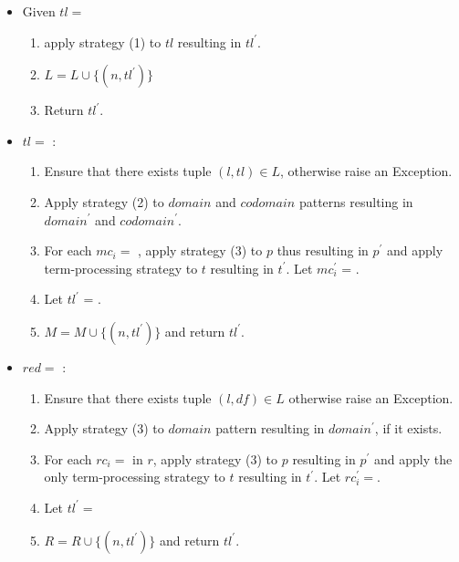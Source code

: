 \begin{itemize}
\item
Given $tl=$\TlDefineLanguage
	\begin{enumerate}
		\item apply strategy (1) to $tl$ resulting in $tl^{\prime}$.
		\item $L = L \cup \{ (n, tl^{\prime}) \}$
		\item Return $tl^{\prime}$.
	\end{enumerate}

\item $tl=$ \TlDefineMetafunction:
	\begin{enumerate}
	\item Ensure that there exists tuple $(l, tl) \in L$, otherwise raise an Exception.
	\item Apply strategy (2) to $domain$ and $codomain$ patterns resulting in $domain^\prime$ and $codomain^\prime$.
	\item For each $mc_i=$ \MetafunctionCase, apply strategy (3) to $p$ thus resulting in $p^{\prime}$ and apply term-processing strategy to $t$ resulting in $t^{\prime}$. Let $mc_i^{\prime}$ = \MetafunctionCase[$p^{\prime}$][$t^{\prime}$].
	\item Let $tl^\prime$  = .
	\item $M = M \cup \{ (n, tl^\prime)\}$ and return $tl^\prime$.
	\end{enumerate}

\item $red=$ \TlDefineReductionRelation:
\begin{enumerate}
\item Ensure that there exists tuple $(l, df) \in L$ otherwise raise an Exception.
\item Apply strategy (3) to $domain$ pattern resulting in $domain^\prime$, if it exists.
\item For each $rc_i=$ \ReductionCase \space in $r$, apply strategy (3) to $p$ resulting in $p^{\prime}$ and apply the only term-processing strategy to $t$ resulting in $t^\prime$. Let $rc_i^\prime=$\ReductionCase[$p^{\prime}$][$t^{\prime}$][$n$][false].
\item Let $tl^\prime=$
\item $R = R \cup \{ (n, tl^\prime) \}$ and return $tl^\prime$.

\end{enumerate}


\end{itemize}
